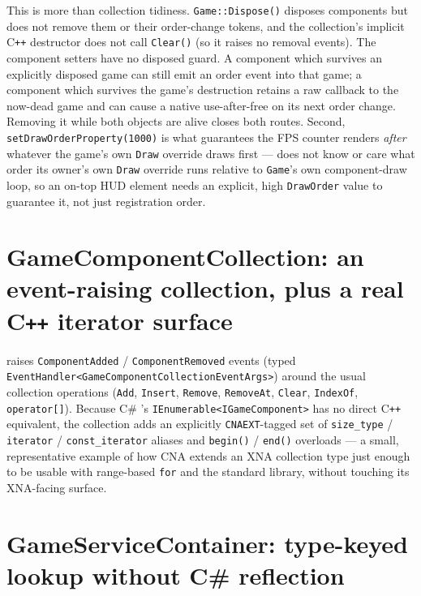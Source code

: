 This is more than collection tidiness. \texttt{Game::Dispose()} disposes components but does not
remove them or their order-change tokens, and the collection's implicit C\texttt{++} destructor
does not call \texttt{Clear()} (so it raises no removal events). The component setters have no
disposed guard. A component which survives an explicitly disposed game can still emit an order
event into that game; a component which survives the game's destruction retains a raw callback to
the now-dead game and can cause a native use-after-free on its next order change. Removing it
while both objects are alive closes both routes. Second,
\texttt{setDrawOrderProperty(1000)} is what guarantees the FPS counter renders \emph{after}
whatever the game's own \texttt{Draw} override draws first --- 
does not know or care what order its owner's own \texttt{Draw} override runs relative to
\texttt{Game}'s own component-draw loop, so an on-top HUD element needs an explicit, high
\texttt{DrawOrder} value to guarantee it, not just registration order.

\section[GameComponentCollection: an event-raising collection]{GameComponentCollection: an event-raising collection, plus a real C\texttt{++} iterator surface}

 raises \texttt{ComponentAdded} / \texttt{ComponentRemoved}
events (typed \texttt{EventHandler<GameComponentCollectionEventArgs>}) around the usual
collection operations (\texttt{Add}, \texttt{Insert}, \texttt{Remove}, \texttt{RemoveAt},
\texttt{Clear}, \texttt{IndexOf}, \texttt{operator[]}). Because C\# 's
\texttt{IEnumerable<IGameComponent>} has no direct C\texttt{++} equivalent, the collection
adds an explicitly \texttt{CNAEXT}-tagged set of \texttt{size\_type} / \texttt{iterator} /
\texttt{const\_iterator} aliases and \texttt{begin()} / \texttt{end()} overloads --- a small,
representative example of how CNA extends an XNA collection type just enough to be usable
with range-based \texttt{for} and the standard library, without touching its XNA-facing
surface.

\section{GameServiceContainer: type-keyed lookup without C\# reflection}

